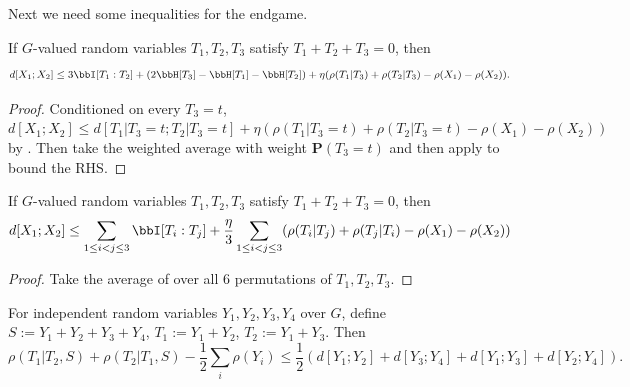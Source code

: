 Next we need some inequalities for the endgame.

\begin{lemma}\label{rho-BSG-triplet}\leanok
  If $G$-valued random variables $T_1,T_2,T_3$ satisfy $T_1+T_2+T_3=0$, then
  $$d[X_1;X_2]\le 3\bbI[T_1:T_2] + (2\bbH[T_3]-\bbH[T_1]-\bbH[T_2])+ \eta(\rho(T_1|T_3)+\rho(T_2|T_3)-\rho(X_1)-\rho(X_2)).$$
\end{lemma}

\begin{proof}\leanok{}
  Conditioned on every $T_3=t$, $d[X_1;X_2]\le d[T_1|T_3=t;T_2|T_3=t]+\eta(\rho(T_1|T_3=t)+\rho(T_2|T_3=t)-\rho(X_1)-\rho(X_2))$ by . Then take the weighted average with weight $\mathbf{P}(T_3=t)$ and then apply  to bound the RHS.
\end{proof}

\begin{lemma}\label{rho-BSG-triplet-symmetrized}\leanok
  If $G$-valued random variables $T_1,T_2,T_3$ satisfy $T_1+T_2+T_3=0$, then
  $$d[X_1;X_2] \leq  \sum_{1 \leq i<j \leq 3} \bbI[T_i:T_j] + \frac{\eta}{3}   \sum_{1 \leq i<j \leq 3} (\rho(T_i|T_j) + \rho(T_j|T_i) -\rho(X_1)-\rho(X_2))$$
\end{lemma}

\begin{proof}\leanok{}
  Take the average of  over all $6$ permutations of $T_1,T_2,T_3$.
\end{proof}


\begin{lemma}\label{rho-increase}\leanok
  For independent random variables $Y_1,Y_2,Y_3,Y_4$ over $G$, define $S:=Y_1+Y_2+Y_3+Y_4$, $T_1:=Y_1+Y_2$, $T_2:=Y_1+Y_3$. Then
  $$\rho(T_1|T_2,S)+\rho(T_2|T_1,S) - \frac{1}{2}\sum_{i} \rho(Y_i)\le \frac{1}{2}(d[Y_1;Y_2]+d[Y_3;Y_4]+d[Y_1;Y_3]+d[Y_2;Y_4]).$$
\end{lemma}

